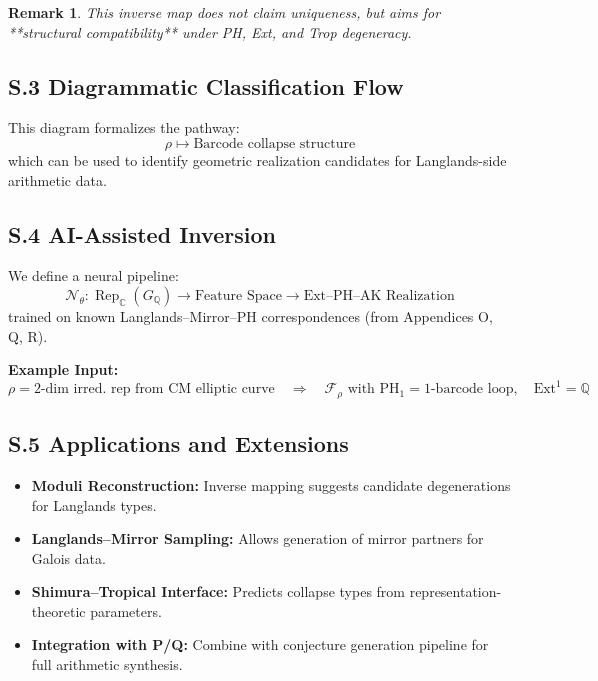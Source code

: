\documentclass[11pt]{article}
\newtheorem{remark}[theorem]{Remark}
\begin{document}
\begin{remark}
This inverse map does not claim uniqueness, but aims for **structural compatibility** under PH, Ext, and Trop degeneracy.
\end{remark}

\subsection*{S.3 Diagrammatic Classification Flow}

\vspace{1em}
\begin{center}
\end{center}
\vspace{1em}

This diagram formalizes the pathway:
\[
\rho \mapsto \text{Barcode collapse structure}
\]
which can be used to identify geometric realization candidates for Langlands-side arithmetic data.

\subsection*{S.4 AI-Assisted Inversion}

We define a neural pipeline:
\[
\mathcal{N}_\theta: \operatorname{Rep}_{\mathbb{C}}(G_{\mathbb{Q}}) \to \text{Feature Space} \to \text{Ext–PH–AK Realization}
\]
trained on known Langlands–Mirror–PH correspondences (from Appendices O, Q, R).

\textbf{Example Input:}
\[
\rho = \text{2-dim irred. rep from CM elliptic curve}
\quad \Rightarrow \quad
\mathcal{F}_\rho \text{ with } \mathrm{PH}_1 = \text{1-barcode loop}, \quad \mathrm{Ext}^1 = \mathbb{Q}
\]

\subsection*{S.5 Applications and Extensions}

\begin{itemize}
  \item \textbf{Moduli Reconstruction:} Inverse mapping suggests candidate degenerations for Langlands types.
  \item \textbf{Langlands–Mirror Sampling:} Allows generation of mirror partners for Galois data.
  \item \textbf{Shimura–Tropical Interface:} Predicts collapse types from representation-theoretic parameters.
  \item \textbf{Integration with P/Q:} Combine with conjecture generation pipeline for full arithmetic synthesis.
\end{itemize}
\end{document}
